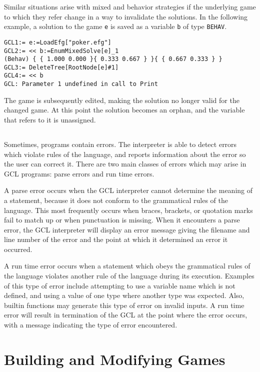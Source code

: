 Similar situations arise with mixed and behavior strategies if the
underlying game to which they refer change in a way to invalidate the
solutions.  In the following example, a solution to the game \verb+e+
is saved as a variable \verb+b+ of type \verb+BEHAV+.  

\begin{verbatim}
GCL1:= e:=LoadEfg["poker.efg"]
GCL2:= << b:=EnumMixedSolve[e]_1
(Behav) { { 1.000 0.000 }{ 0.333 0.667 } }{ { 0.667 0.333 } }
GCL3:= DeleteTree[RootNode[e]#1]
GCL4:= << b
GCL: Parameter 1 undefined in call to Print
\end{verbatim}

The game is subsequently edited, making the solution no longer valid
for the changed game.  At this point the solution becomes an orphan,
and the variable that refers to it is unassigned.  

\section{}

Sometimes, programs contain errors.  The interpreter is able to detect
errors which violate rules of the language, and reports information
about the error so the user can correct it.  There are two main
classes of errors which may arise in GCL programs: parse errors and
run time errors.

A parse error occurs when the GCL interpreter cannot determine the
meaning of a statement, because it does not conform to the grammatical
rules of the language.  This most frequently occurs when braces,
brackets, or quotation marks fail to match up or when punctuation is
missing.  When it encounters a parse error, the GCL interpreter will
display an error message giving the filename and line number of the
error and the point at which it determined an error it occurred.

A run time error occurs when a statement which obeys the grammatical
rules of the language violates another rule of the language during its
execution.  Examples of this type of error include attempting to use a
variable name which is not defined, and using a value of one type
where another type was expected.  Also, builtin functions may generate
this type of error on invalid inputs.  A run time error will result in
termination of the GCL at the point where the error occurs, with a
message indicating the type of error encountered.

\chapter{Building and Modifying Games}

